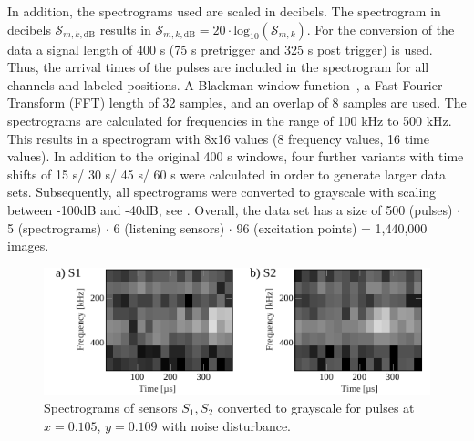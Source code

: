 In addition, the spectrograms used are scaled in decibels. The spectrogram in decibels $\mathcal{S}_{m,k,\mathrm{dB}}$ results in $\mathcal{S}_{m,k,\mathrm{dB}}= 20 \cdot \mathrm{log}_{10}(\mathcal{S}_{m,k})$. For the conversion of the data a signal length of 400 \textmu s (75 \textmu s pretrigger and 325 \textmu s post trigger) is used. Thus, the arrival times of the pulses are included in the spectrogram for all channels and labeled positions. A Blackman window function~\cite{blackman_window}, a Fast Fourier Transform (FFT) length of 32 samples, and an overlap of 8 samples are used. The spectrograms are calculated for frequencies in the range of 100 kHz to 500 kHz. This results in a spectrogram with 8x16 values (8 frequency values, 16 time values). In addition to the original 400 \textmu s windows, four further variants with time shifts of 15 \textmu s/ 30 \textmu s/ 45 \textmu s/ 60 \textmu s were calculated in order to generate larger data sets. Subsequently, all spectrograms were converted to grayscale with scaling between -100dB and -40dB, see . Overall, the data set has a size of 500 (pulses) $\cdot$ 5 (spectrograms) $\cdot$ 6 (listening sensors) $\cdot$ 96 (excitation points) = 1,440,000 images.

\begin{figure}[t!]
	\centering
	\includegraphics[width=\columnwidth]{../figures/histograms/spectrograms.pdf}
	\caption{Spectrograms of sensors $S_1, S_2$ converted to grayscale for pulses at $x =0.105$, $y = 0.109$ with noise disturbance.}
	\label{fig:spectrograms}
\end{figure}

